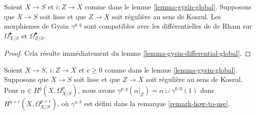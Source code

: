 \begin{lemma}
\label{lemma-gysin-differential-hodge}
Soient $X \to S$ et $i : Z \to X$ comme dans le lemme \ref{lemma-gysin-global}.
Supposons que $X \to S$ soit lisse et que $Z \to X$ soit régulière au sens de Koszul.
Les morphismes de Gysin $\gamma^{p, q}$ sont compatibles avec les différentielles de de Rham
sur $\Omega^\bullet_{X/S}$ et $\Omega^\bullet_{Z/S}$.
\end{lemma}

\begin{proof}
Cela résulte immédiatement du
lemme \ref{lemma-gysin-differential-global}.
\end{proof}

\begin{lemma}
\label{lemma-gysin-projection-global}
Soient $X \to S$, $i : Z \to X$ et $c \geq 0$ comme dans le
lemme \ref{lemma-gysin-global}. Supposons que $X \to S$ soit lisse et
que $Z \to X$ soit régulière au sens de Koszul. Pour $\alpha \in H^q(X, \Omega^p_{X/S})$, nous avons
$\gamma^{p, q}(\alpha|_Z) = \alpha \cup \gamma^{0, 0}(1)$ dans
$H^{q + c}(X, \Omega^{p + c}_{X/S})$, où $\gamma^{a, b}$ est défini dans la
remarque \ref{remark-how-to-use}.
\end{lemma}

